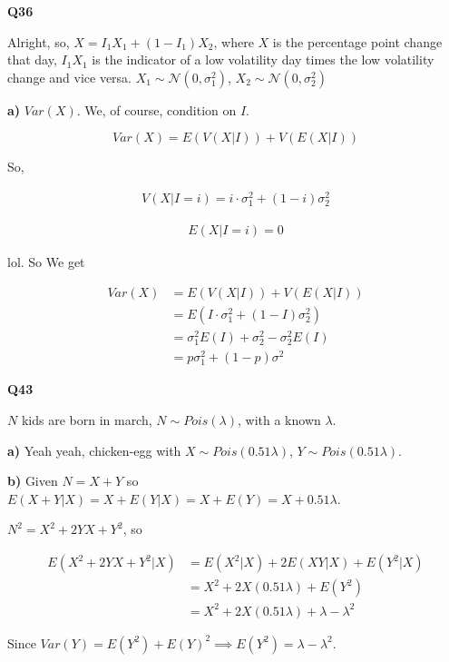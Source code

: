 \documentclass{article}
\begin{document}
			\hfill
			
		\textbf{Q36}
		
			Alright, so, $X=I_1X_1 + (1-I_1)X_2$, where $X$ is the percentage point change that day, $I_1X_1$ is the indicator of a low volatility day times the low volatility change and vice versa. $X_1\sim\mathcal{N}(0, \sigma_1^2)$, $X_2\sim\mathcal{N}(0, \sigma_2^2)$

			\textbf{a)} $Var(X)$. We, of course, condition on $I$. 
			
			\[ Var(X) = E(V(X|I))+V(E(X|I)) \]
			
			So, 
			
			\begin{align*}
			V(X|I=i) = i\cdot \sigma_1^2+(1-i)\sigma_2^2
			\end{align*}
			
			\begin{align*}
			E(X|I=i) = 0
			\end{align*}
			
			lol. So We get
			
			\begin{align*}
			Var(X) &= E(V(X|I))+V(E(X|I))\\
			&= E(I\cdot \sigma_1^2+(1-I)\sigma_2^2)\\
			&=\sigma_1^2E(I)+ \sigma_2^2 - \sigma_2^2E(I)\\
			&=p\sigma_1^2 + (1-p)\sigma^2
			\end{align*}
			
			\hfill
			
		\textbf{Q43}
		
			$N$ kids are born in march, $N\sim Pois(\lambda)$, with a known $\lambda$.
			
			\textbf{a)} Yeah yeah, chicken-egg with $X\sim Pois(0.51\lambda)$, $Y\sim Pois(0.51\lambda)$.
			
			\textbf{b)} Given $N=X+Y$ so $E(X+Y|X) = X+E(Y|X) = X+E(Y) = X+0.51\lambda$.
			
			$N^2 = X^2+2YX + Y^2$, so
			
			\begin{align*}
			E(X^2+2YX + Y^2|X) &= E(X^2|X) + 2E(XY|X) + E(Y^2|X)\\
			&= X^2 + 2X(0.51\lambda) + E(Y^2)\\
			&= X^2 + 2X(0.51\lambda) + \lambda-\lambda^2
			\end{align*}
			
			Since $Var(Y) = E(Y^2) + E(Y)^2\implies E(Y^2) = \lambda-\lambda^2$.
			
\end{document}
